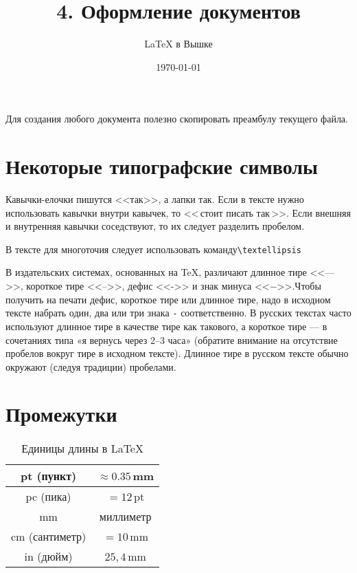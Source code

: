 \documentclass[a4paper,11pt]{article} %
\title{\Huge{4. Оформление документов}}
\author{\LARGE{\LaTeX{} в Вышке}}
\date{\LARGE\today}
\begin{document}

\maketitle %

Для создания любого документа полезно скопировать преамбулу текущего файла.

\section{Некоторые типографские символы}

Кавычки-елочки пишутся <<так>>, а лапки \glqq так\grqq. Если в тексте нужно использовать кавычки внутри кавычек, то <<\,\glqq стоит писать так\grqq\,>>. Если внешняя и внутренняя кавычки соседствуют, то их следует разделить пробелом.

В тексте для многоточия следует использовать команду\textellipsis \verb"\textellipsis"

В издательских системах, основанных на \TeX, различают длинное тире <<--->>, короткое тире <<-->>, дефис <<->> и знак минуса <<$-$>>.Чтобы получить на печати дефис, короткое тире или длинное тире, надо в исходном тексте набрать один, два или три знака \verb"-" соответственно. В русских текстах часто используют длинное тире в качестве тире
как такового, а короткое тире --- в сочетаниях типа «я вернусь через 2--3
часа» (обратите внимание на отсутствие пробелов вокруг тире в исходном тексте). Длинное тире в русском тексте обычно окружают (следуя традиции) пробелами.


\section{Промежутки}
\begin{table}[h]
	\begin{center}
		\begin{tabular}{|c|c|}
			\hline
			pt (пункт) & $\approx0.35$\,mm \\ \hline 
			pc (пика) & $=12$\,pt \\ \hline
			mm & миллиметр\\ \hline
			cm (сантиметр) & $=10$\,mm\\ \hline
			in (дюйм) & $25,4$\,mm\\ \hline
		\end{tabular}\caption{Единицы длины в \LaTeX}
	\end{center}
\end{table}
\end{document}
